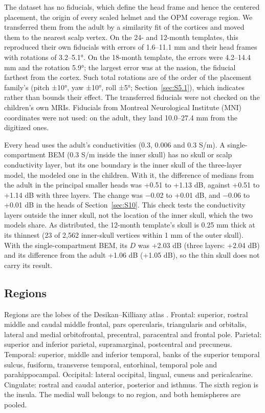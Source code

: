\documentclass[preprint,12pt,authoryear,a4paper]{elsarticle}
\begin{document}
The dataset has no fiducials, which define the head frame and hence the centered placement, the origin of every scaled helmet and the OPM coverage region. We transferred them from the adult by a similarity fit of the cortices and moved them to the nearest scalp vertex. On the 24- and 12-month templates, this reproduced their own fiducials with errors of 1.6–11.1 mm and their head frames with rotations of 3.2–5.1°. On the 18-month template, the errors were 4.2–14.4 mm and the rotation 5.9°; the largest error was at the nasion, the fiducial farthest from the cortex. Such total rotations are of the order of the placement family's (pitch ±10°, yaw ±10°, roll ±5°; Section~\ref{sec:S5.1}), which indicates rather than bounds their effect. The transferred fiducials were not checked on the children's own MRIs. Fiducials from Montreal Neurological Institute (MNI) coordinates were not used: on the adult, they land 10.0–27.4 mm from the digitized ones.

Every head uses the adult's conductivities (0.3, 0.006 and 0.3 S/m). A single-compartment BEM (0.3 S/m inside the inner skull) has no skull or scalp conductivity layer, but its one boundary is the inner skull of the three-layer model, the modeled one in the children. With it, the difference of medians from the adult in the principal smaller heads was +0.51 to +1.13 dB, against +0.51 to +1.14 dB with three layers. The change was −0.02 to +0.01 dB, and −0.06 to +0.01 dB in the heads of Section~\ref{sec:S10}. This check tests the conductivity layers outside the inner skull, not the location of the inner skull, which the two models share. As distributed, the 12-month template's skull is 0.25 mm thick at its thinnest (23 of 2,562 inner-skull vertices within 1 mm of the outer skull). With the single-compartment BEM, its $D$ was +2.03 dB (three layers: +2.04 dB) and its difference from the adult +1.06 dB (+1.05 dB), so the thin skull does not carry its result.

\subsection{Regions}\label{sec:S4.2}

Regions are the lobes of the Desikan--Killiany atlas \citep{desikan2006}. Frontal: superior, rostral middle and caudal middle frontal, pars opercularis, triangularis and orbitalis, lateral and medial orbitofrontal, precentral, paracentral and frontal pole. Parietal: superior and inferior parietal, supramarginal, postcentral and precuneus. Temporal: superior, middle and inferior temporal, banks of the superior temporal sulcus, fusiform, transverse temporal, entorhinal, temporal pole and parahippocampal. Occipital: lateral occipital, lingual, cuneus and pericalcarine. Cingulate: rostral and caudal anterior, posterior and isthmus. The sixth region is the insula. The medial wall belongs to no region, and both hemispheres are pooled.
\end{document}
